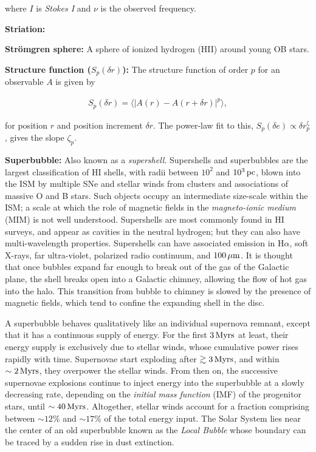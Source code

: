 \documentclass[a4paper,10pt]{article}
\begin{document}
{\noindent}where $I$ is \textit{Stokes I} and $\nu$ is the observed frequency.

{\noindent}\textbf{Striation:} 

{\noindent}\textbf{Str\"{o}mgren sphere:} A sphere of ionized hydrogen (HII) around young OB stars.

{\noindent}\textbf{Structure function ($S_p(\delta r)$):} The structure function of order $p$ for an observable $A$ is given by

\begin{align*}
    S_p(\delta r) = \langle\lvert A(r)-A(r+\delta r)\rvert^p\rangle,
\end{align*}

{\noindent}for position $r$ and position increment $\delta r$. The power-law fit to this, $S_p(\delta e)\propto\delta r^{\upzeta}_p$, gives the slope $\zeta_p$.

{\noindent}\textbf{Superbubble:} Also known as a \textit{supershell}. Supershells and superbubbles are the largest classification of HI shells, with radii between $10^2$ and $10^3\,{\rm pc}$, blown into the ISM by multiple SNe and stellar winds from clusters and associations of massive O and B stars. Such objects occupy an intermediate size-scale within the ISM; a scale at which the role of magnetic fields in the \textit{magneto-ionic medium} (MIM) is not well understood. Supershells are most commonly found in HI surveys, and appear as cavities in the neutral hydrogen; but they can also have multi-wavelength properties. Supershells can have associated emission in H$\alpha$, soft X-rays, far ultra-violet, polarized radio continuum, and $100\,\mu{\rm m}$. It is thought that once bubbles expand far enough to break out of the gas of the Galactic plane, the shell breaks open into a Galactic chimney, allowing the flow of hot gas into the halo. This transition from bubble to chimney is slowed by the presence of magnetic fields, which tend to confine the expanding shell in the disc.

A superbubble behaves qualitatively like an individual supernova remnant, except that it has a continuous supply of energy. For the first $3\,{\rm Myrs}$ at least, their energy supply is exclusively due to stellar winds, whose cumulative power rises rapidly with time. Supernovae start exploding after $\gtrsim3\,{\rm Myrs}$, and within $\sim2\,{\rm Myrs}$, they overpower the stellar winds. From then on, the successive supernovae explosions continue to inject energy into the superbubble at a slowly decreasing rate, depending on the \textit{initial mass function} (IMF) of the progenitor stars, until $\sim40\,{\rm Myrs}$. Altogether, stellar winds account for a fraction comprising between $\sim12\%$ and $\sim17\%$ of the total energy input. The Solar System lies near the center of an old superbubble known as the \textit{Local Bubble} whose boundary can be traced by a sudden rise in dust extinction.
\end{document}
